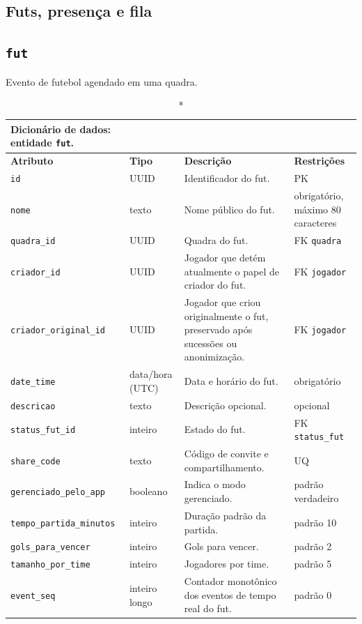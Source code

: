 \begin{apendicesenv}
    \section*{Futs, presença e fila}

    \subsection*{\texttt{fut}}
    Evento de futebol agendado em uma quadra.
    \begin{longtable}{p{2.5cm}p{2.1cm}p{5.8cm}p{2.9cm}}
    \caption*{Dicionário de dados: entidade \texttt{fut}.}\\
        \hline
        \textbf{Atributo} & \textbf{Tipo} & \textbf{Descrição} & \textbf{Restrições} \\
        \hline
        \endhead
        \texttt{id} & UUID & Identificador do fut. & PK \\
        \texttt{nome} & texto & Nome público do fut. & obrigatório, máximo 80 caracteres \\
        \texttt{quadra\_id} & UUID & Quadra do fut. & FK \texttt{quadra} \\
        \texttt{criador\_id} & UUID & Jogador que detém atualmente o papel de criador do fut. & FK \texttt{jogador} \\
        \texttt{criador\_original\_id} & UUID & Jogador que criou originalmente o fut, preservado após sucessões ou anonimização. & FK \texttt{jogador} \\
        \texttt{date\_time} & data/hora (UTC) & Data e horário do fut. & obrigatório \\
        \texttt{descricao} & texto & Descrição opcional. & opcional \\
        \texttt{status\_fut\_id} & inteiro & Estado do fut. & FK \texttt{status\_fut} \\
        \texttt{share\_code} & texto & Código de convite e compartilhamento. & UQ \\
        \texttt{gerenciado\_pelo\_app} & booleano & Indica o modo gerenciado. & padrão verdadeiro \\
        \texttt{tempo\_partida\_minutos} & inteiro & Duração padrão da partida. & padrão 10 \\
        \texttt{gols\_para\_vencer} & inteiro & Gols para vencer. & padrão 2 \\
        \texttt{tamanho\_por\_time} & inteiro & Jogadores por time. & padrão 5 \\
        \texttt{event\_seq} & inteiro longo & Contador monotônico dos eventos de tempo real do fut. & padrão 0 \\

\end{longtable}
\end{apendicesenv}
